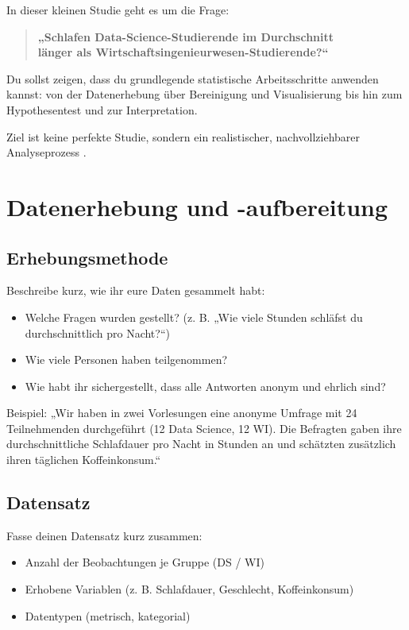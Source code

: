 \documentclass[12pt,a4paper]{article}
\begin{document}
In dieser kleinen Studie geht es um die Frage:

\begin{quote}
\textbf{„Schlafen Data-Science-Studierende im Durchschnitt \\ länger als Wirtschaftsingenieurwesen-Studierende?“}
\end{quote}

Du sollst zeigen, dass du grundlegende statistische Arbeitsschritte anwenden kannst:
von der Datenerhebung über Bereinigung und Visualisierung bis hin zum Hypothesentest und zur Interpretation.  

Ziel ist keine perfekte Studie, sondern ein realistischer, nachvollziehbarer Analyseprozess \citep{Meintrup2019Statistik}.

\section{Datenerhebung und -aufbereitung}

\subsection{Erhebungsmethode}

Beschreibe kurz, wie ihr eure Daten gesammelt habt:
\begin{itemize}
  \item Welche Fragen wurden gestellt? (z. B. „Wie viele Stunden schläfst du durchschnittlich pro Nacht?“)
  \item Wie viele Personen haben teilgenommen?
  \item Wie habt ihr sichergestellt, dass alle Antworten anonym und ehrlich sind?
\end{itemize}

Beispiel:  
„Wir haben in zwei Vorlesungen eine anonyme Umfrage mit 24 Teilnehmenden durchgeführt (12 Data Science, 12 WI). Die Befragten gaben ihre durchschnittliche Schlafdauer pro Nacht in Stunden an und schätzten zusätzlich ihren täglichen Koffeinkonsum.“

\subsection{Datensatz}

Fasse deinen Datensatz kurz zusammen:
\begin{itemize}
  \item Anzahl der Beobachtungen je Gruppe (DS / WI)
  \item Erhobene Variablen (z. B. Schlafdauer, Geschlecht, Koffeinkonsum)
  \item Datentypen (metrisch, kategorial)
\end{itemize}
\end{document}
